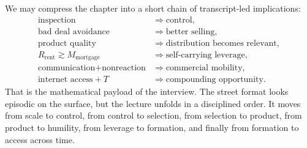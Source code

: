We may compress the chapter into a short chain of transcript-led implications:
\begin{align}
\text{inspection} &\Rightarrow \text{control},\\
\text{bad deal avoidance} &\Rightarrow \text{better selling},\\
\text{product quality} &\Rightarrow \text{distribution becomes relevant},\\
R_{\text{rent}} \gtrsim M_{\text{mortgage}} &\Rightarrow \text{self-carrying leverage},\\
\text{communication} + \text{nonreaction} &\Rightarrow \text{commercial mobility},\\
\text{internet access} + T &\Rightarrow \text{compounding opportunity}.
\end{align}
That is the mathematical payload of the interview. The street format looks episodic on the surface, but the lecture unfolds in a disciplined order. It moves from scale to control, from control to selection, from selection to product, from product to humility, from leverage to formation, and finally from formation to access across time.